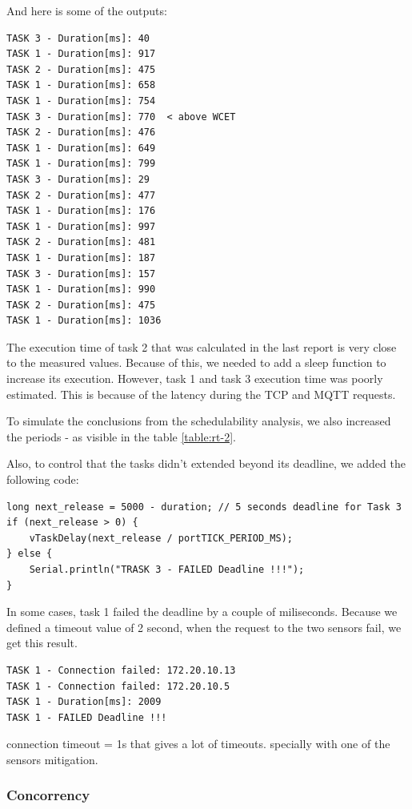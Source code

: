 \documentclass[11pt]{article}
\begin{document}
\noindent
And here is some of the outputs:

\begin{verbatim}
TASK 3 - Duration[ms]: 40
TASK 1 - Duration[ms]: 917
TASK 2 - Duration[ms]: 475
TASK 1 - Duration[ms]: 658
TASK 1 - Duration[ms]: 754
TASK 3 - Duration[ms]: 770  < above WCET
TASK 2 - Duration[ms]: 476
TASK 1 - Duration[ms]: 649
TASK 1 - Duration[ms]: 799
TASK 3 - Duration[ms]: 29
TASK 2 - Duration[ms]: 477
TASK 1 - Duration[ms]: 176
TASK 1 - Duration[ms]: 997
TASK 2 - Duration[ms]: 481
TASK 1 - Duration[ms]: 187
TASK 3 - Duration[ms]: 157
TASK 1 - Duration[ms]: 990
TASK 2 - Duration[ms]: 475
TASK 1 - Duration[ms]: 1036
\end{verbatim}

The execution time of task 2 that was calculated in the last report is very close to the measured values. Because of this, we needed to add a sleep function to increase its execution.
However, task 1 and task 3 execution time was poorly estimated. This is because of the latency during the TCP and MQTT requests.

To simulate the conclusions from the schedulability analysis, we also increased the periods - as visible in the table \ref{table:rt-2}.

Also, to control that the tasks didn't extended beyond its deadline, we added the following code:

\begin{verbatim}
long next_release = 5000 - duration; // 5 seconds deadline for Task 3
if (next_release > 0) {
    vTaskDelay(next_release / portTICK_PERIOD_MS);
} else {
    Serial.println("TRASK 3 - FAILED Deadline !!!");
}
\end{verbatim}

In some cases, task 1 failed the deadline by a couple of miliseconds. Because we defined a timeout value of 2 second, when the request to the two sensors fail, we get this result.

\begin{verbatim}
TASK 1 - Connection failed: 172.20.10.13
TASK 1 - Connection failed: 172.20.10.5
TASK 1 - Duration[ms]: 2009
TASK 1 - FAILED Deadline !!!
\end{verbatim}


connection timeout = 1s
that gives a lot of timeouts. specially with one of the sensors
mitigation.

\subsubsection{Concorrency}
\end{document}
